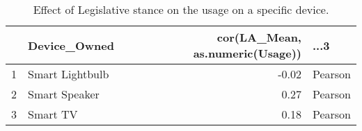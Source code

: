 \begin{table}[ht]
\centering
\begin{tabular}{rlrl}
  \hline
 & Device\_Owned & cor(LA\_Mean, as.numeric(Usage)) & ...3 \\ 
  \hline
1 & Smart Lightbulb & -0.02 & Pearson \\ 
  2 & Smart Speaker & 0.27 & Pearson \\ 
  3 & Smart TV & 0.18 & Pearson \\ 
   \hline
\end{tabular}
\caption{Effect of Legislative stance on the usage on a specific device.} 
\end{table}
